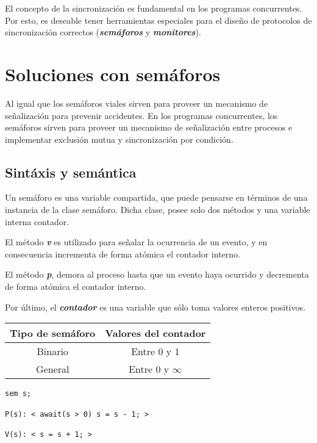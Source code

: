 \documentclass[a4paper, 10pt]{report}
\begin{document}
El concepto de la sincronización es fundamental en los programas concurrentes. Por esto, es deseable tener herramientas especiales para el diseño de protocolos de sincronización correctos (\textbf{\emph{semáforos}} y \textbf{\emph{monitores}}).

\chapter{Soluciones con semáforos}
\vspace*{-10mm}

Al igual que los semáforos viales sirven para proveer un mecanismo de señalización para prevenir accidentes. En los programas concurrentes, los semáforos sirven para proveer un mecanismo de señalización entre procesos e implementar exclusión mutua y sincronización por condición.

\section{Sintáxis y semántica}

Un semáforo es una variable compartida, que puede pensarse en términos de una instancia de la clase semáforo. Dicha clase, posee solo dos métodos y una variable interna contador. 

El método \textbf{\emph{v}} es utilizado para señalar la ocurrencia de un evento, y en consecuencia incrementa de forma atómica el contador interno.

El método \textbf{\emph{p}}, demora al proceso hasta que un evento haya ocurrido y decrementa de forma atómica el contador interno.

Por último, el \textbf{\emph{contador}} es una variable que sólo toma valores enteros positivos.



\begin{multicols}{2}

    {\renewcommand{\arraystretch}{2}%
    \centering
    \begin{tabular}{cc}
        \textbf{Tipo de semáforo} & \textbf{Valores del contador}\\
        \hline 
        Binario & Entre 0 y 1\\ 
        General & Entre 0 y $\infty$\\ 
    \end{tabular}}

\begin{lstlisting}
sem s;

P(s): < await(s > 0) s = s - 1; >

V(s): < s = s + 1; >
\end{lstlisting}

\columnbreak


    
\end{multicols}
\end{document}
